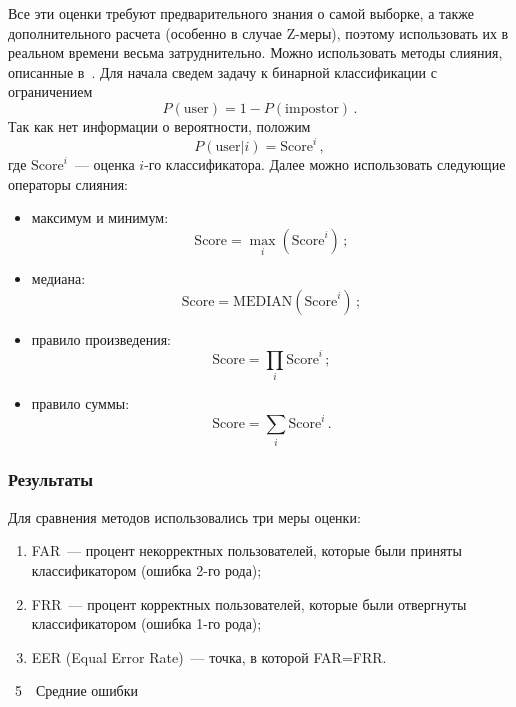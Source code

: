 \begin{multicols}{2}
Все эти оценки требуют предварительного знания о самой выборке, а
также дополнительного расчета (особенно в случае Z-ме\-ры), поэтому
использовать их в реальном времени весьма затруднительно. Можно
использовать методы слияния, описанные в~\cite{kittler}. Для начала
сведем задачу к бинарной классификации с ограничением 
$$
P(\mathrm{user}) = 1 - P(\mathrm{impostor})\,.
$$
Так как нет информации о вероятности, положим
$$
P(\mathrm{user}|i) = \mathrm{Score}^i\,,$$
 где $\mathrm{Score}^i$~--- оценка $i$-го
классификатора. Далее можно использовать следующие операторы
слияния:
\begin{itemize}
    \item максимум и минимум: 
    $$
    \mathrm{Score}= \max\limits_i (\mathrm{Score}^i)\,;
    $$
    \item медиана: 
    $$\mathrm{Score}= \mathrm{MEDIAN}(\mathrm{Score}^i)\,;
    $$
    \item правило произведения: 
    $$
    \mathrm{Score}= \prod\limits_i \mathrm{Score}^i\,;
    $$
    \item правило суммы: 
    $$
    \mathrm{Score}= \sum\limits_i \mathrm{Score}^i\,.
    $$
\end{itemize}

\subsubsection{Результаты}

Для сравнения методов использовались три меры оценки:
\begin{enumerate}[(1)]
    \item FAR~--- процент некорректных пользователей, 
    которые были приняты классификатором (ошибка 2-го рода);
    \item FRR~--- процент корректных пользователей, 
    которые были отвергнуты классификатором (ошибка 1-го рода);
    \item EER (Equal Error Rate)~--- точка, в которой FAR\;=\;FRR.
\end{enumerate}

\begin{center}  %
{{\tablename~5}\ \ \small{Средние ошибки}}

\vspace*{6pt}



\end{center}
\end{multicols}
